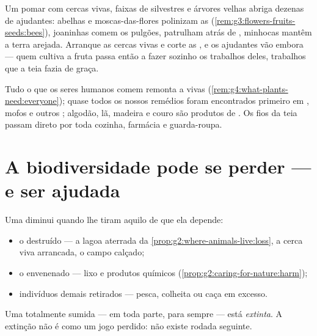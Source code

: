 \begin{example}\label{ex:g5:biodiversity:orchard}
Um pomar com cercas vivas, faixas de  silvestres e árvores
velhas abriga dezenas de  ajudantes: abelhas e moscas-das-flores
polinizam as 
(\cref{rem:g3:flowers-fruits-seeds:bees}), joaninhas comem os
pulgões,  patrulham atrás de , minhocas mantêm a terra
arejada. Arranque as cercas vivas e corte as , e os ajudantes
vão embora --- quem cultiva a fruta passa então a fazer sozinho os
trabalhos deles, trabalhos que a teia fazia de graça.
\end{example}

\begin{example}\label{ex:g5:biodiversity:people}
Tudo o que os seres humanos comem remonta a  vivas
(\cref{rem:g4:what-plants-need:everyone}); quase todos os nossos
remédios foram encontrados primeiro em , mofos e outros ; algodão, lã, madeira e couro são produtos de . Os
fios da teia passam direto por toda cozinha, farmácia e guarda-roupa.
\end{example}

\section{A biodiversidade pode se perder --- e ser ajudada}

\begin{proposition}\label{prop:g5:biodiversity:loss}
Uma  diminui quando lhe tiram aquilo de que ela depende:
\begin{itemize}
  \item o \emph{} destruído --- a lagoa aterrada da
        \cref{prop:g2:where-animals-live:loss}, a cerca viva
        arrancada, o campo calçado;
  \item o  envenenado --- lixo e produtos químicos
        (\cref{prop:g2:caring-for-nature:harm});
  \item indivíduos demais retirados --- pesca, colheita ou caça em
        excesso.
\end{itemize}
Uma  totalmente sumida --- em toda parte, para sempre --- está
\emph{extinta}. A extinção não é como um jogo perdido:
não existe rodada seguinte.
\end{proposition}
\admitted

